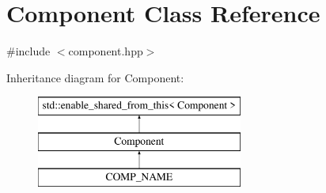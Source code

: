 \hypertarget{classComponent}{}\section{Component Class Reference}
\label{classComponent}


{\ttfamily \#include $<$component.\+hpp$>$}

Inheritance diagram for Component\+:\begin{figure}[H]
\begin{center}
\leavevmode
\includegraphics[height=3.000000cm]{classComponent}
\end{center}
\end{figure}
